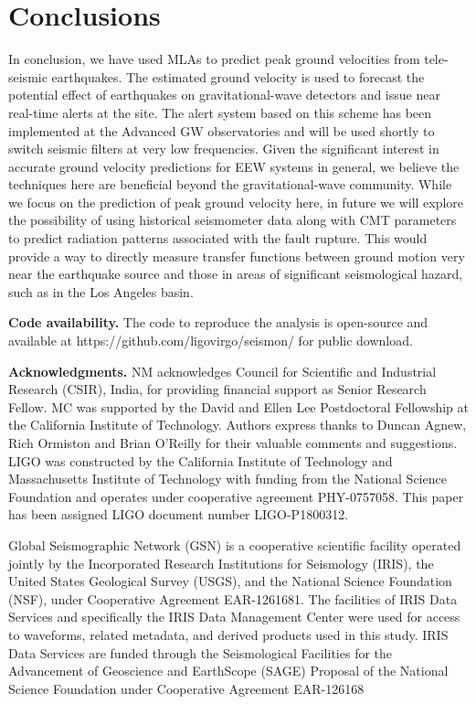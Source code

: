\documentclass[twocolumn, aps, superscriptaddress]{revtex4}
\begin{document}
\section{Conclusions}
In conclusion, we have used MLAs to predict peak ground velocities from tele-seismic earthquakes. The estimated ground velocity is used to forecast the potential effect of earthquakes on gravitational-wave detectors and issue near real-time alerts at the site. The alert system based on this scheme has been implemented at the Advanced GW observatories and will be used shortly to switch seismic filters at very low frequencies. Given the significant interest in accurate ground velocity predictions for EEW systems in general, we believe the techniques here are beneficial beyond the gravitational-wave community. While we focus on the prediction of peak ground velocity here, in future we will explore the possibility of using historical seismometer data along with CMT parameters to predict radiation patterns associated with the fault rupture. This would provide a way to directly measure transfer functions between ground motion very near the earthquake source and those in areas of significant seismological hazard, such as in the Los Angeles basin.


\textbf{Code availability.}
The code to reproduce the analysis is open-source and available at https://github.com/ligovirgo/seismon/ for public download.

\textbf{Acknowledgments.}
NM acknowledges Council for Scientific and Industrial Research (CSIR), India, for providing financial support as Senior Research Fellow.  MC was supported by the David and Ellen Lee Postdoctoral Fellowship at the California Institute of Technology. Authors express thanks to Duncan Agnew, Rich Ormiston and Brian O'Reilly for their valuable comments and suggestions. LIGO was constructed by the California Institute of Technology and Massachusetts Institute of Technology with funding from the National Science Foundation and operates under cooperative agreement PHY-0757058.
This paper has been assigned LIGO document number LIGO-P1800312.

Global Seismographic Network (GSN) is a cooperative scientific facility operated jointly by the Incorporated Research Institutions for Seismology (IRIS), the United States Geological Survey (USGS), and the National Science Foundation (NSF), under Cooperative Agreement EAR-1261681.
The facilities of IRIS Data Services and specifically the IRIS Data Management Center were used for access to waveforms, related metadata, and derived products used in this study. IRIS Data Services are funded through the Seismological Facilities for the Advancement of Geoscience and EarthScope (SAGE) Proposal of the National Science Foundation under Cooperative Agreement EAR-126168



\end{document}
